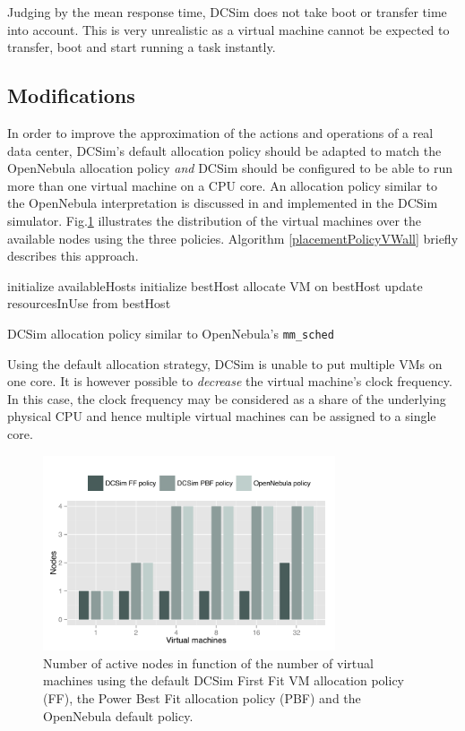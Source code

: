 \documentclass[conference, 10pt]{IEEEtran}
\begin{document}
Judging by the mean response time, DCSim does not take boot or transfer time into account. This is very unrealistic as a virtual machine cannot be expected to transfer, boot and start running a task instantly.

\subsection{Modifications}
\label{sec:modifications}
In order to improve the approximation of the actions and operations of a real data center, DCSim's default allocation policy should be adapted to match the OpenNebula allocation policy \emph{and} DCSim should be configured to be able to run more than one virtual machine on a CPU core. An allocation policy similar to the OpenNebula interpretation is discussed in \cite{pbf} and implemented in the DCSim simulator. Fig.\xspace\ref{fig:vsm_vs_nodes} illustrates the distribution of the virtual machines over the available nodes using the three policies. Algorithm \ref{placementPolicyVWall} briefly describes this approach.

\IncMargin{0.5em}
\begin{algorithm}
initialize availableHosts\;
initialize bestHost\;
allocate VM on bestHost\;
update resourcesInUse from bestHost\;
\BlankLine
\BlankLine
 \caption{DCSim allocation policy similar to OpenNebula's \texttt{mm\_sched}}
 \label{placementPolicyVWall}
\end{algorithm}
 
Using the default allocation strategy, DCSim is unable to put multiple VMs on one core. It is however possible to \emph{decrease} the virtual machine's clock frequency. In this case, the clock frequency may be considered as a share of the underlying physical CPU and hence multiple virtual machines can be assigned to a single core.
 
\begin{figure}
\centering
\includegraphics[width=3.4in]{includes/vms_vs_nodes}
\caption{Number of active nodes in function of the number of virtual machines using the default DCSim First Fit VM allocation policy (FF), the Power Best Fit allocation policy (PBF) and the OpenNebula default policy.}
\label{fig:vsm_vs_nodes}
\end{figure}
 
\end{document}
